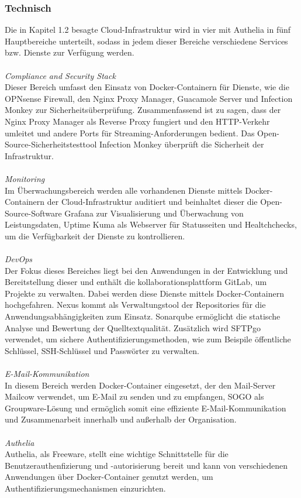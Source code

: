 \subsubsection{Technisch}
\label{sec:Technisch}
Die in Kapitel 1.2 besagte Cloud-Infrastruktur wird in vier \bzw mit Authelia in fünf 
Hauptbereiche unterteilt, sodass in jedem dieser Bereiche verschiedene Services bzw. 
Dienste zur Verfügung werden.
\\
\\\textit{Compliance and Security Stack}
\\Dieser Bereich umfasst den Einsatz von Docker-Containern für Dienste, wie die OPNsense Firewall, 
den Nginx Proxy Manager, Guacamole Server und Infection Monkey zur Sicherheitsüberprüfung. 
Zusammenfassend ist zu sagen, dass der Nginx Proxy Manager als Reverse Proxy fungiert und den HTTP-Verkehr 
umleitet und andere Ports für Streaming-Anforderungen bedient. Das Open-Source-Sicherheitstesttool 
Infection Monkey überprüft die Sicherheit der Infrastruktur.
\\
\\\textit{Monitoring}
\\Im Überwachungsbereich werden alle vorhandenen Dienste mittels Docker-Containern der Cloud-Infrastruktur auditiert und beinhaltet dieser die Open-Source-Software Grafana zur Visualisierung und Überwachung von Leistungsdaten, Uptime Kuma als Webserver für Statusseiten und Healtchchecks, um die Verfügbarkeit der Dienste zu kontrollieren. 
\\
\\\textit{DevOps}
\\Der Fokus dieses Bereiches liegt bei den Anwendungen in der Entwicklung und Bereitstellung dieser und enthält die kollaborationsplattform GitLab, um Projekte zu verwalten. Dabei werden diese Dienste mittels Docker-Containern hochgefahren. Nexus kommt als Verwaltungstool der Repositories für die Anwendungsabhängigkeiten zum Einsatz. Sonarqube ermöglicht die statische Analyse und Bewertung der Quelltextqualität. Zusätzlich wird SFTPgo verwendet, um sichere Authentifizierungsmethoden, wie zum Beispile öffentliche Schlüssel, SSH-Schlüssel und Passwörter zu verwalten.
\\
\\\textit{E-Mail-Kommunikation}
\\In diesem Bereich werden Docker-Container eingesetzt, der den Mail-Server Mailcow verwendet, um E-Mail zu senden und zu empfangen, SOGO als Groupware-Lösung und ermöglich somit eine effiziente E-Mail-Kommunikation und Zusammenarbeit innerhalb und außerhalb der Organisation.
\\
\\\textit{Authelia}
\\Authelia, als Freeware, stellt eine wichtige Schnittstelle für die Benutzerauthenfizierung und -autorisierung bereit und kann von verschiedenen Anwendungen über Docker-Container genutzt werden, um Authentifizierungsmechanismen einzurichten.

